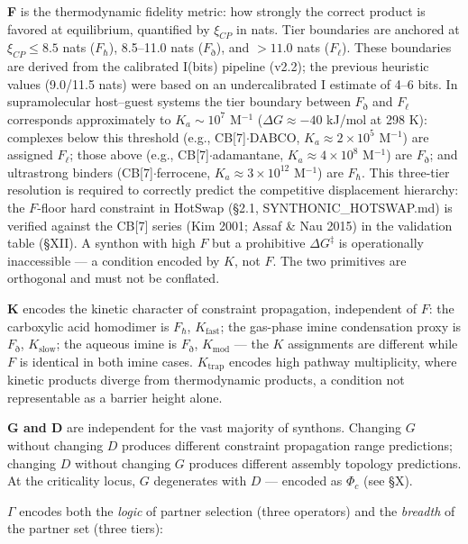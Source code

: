 \documentclass[12pt,a4paper]{article}
\begin{document}
\textbf{F} is the thermodynamic fidelity metric: how strongly the correct product is favored at equilibrium, quantified by $\xi_{CP}$ in nats. Tier boundaries are anchored at $\xi_{CP} \leq 8.5$ nats ($F_{\hbar}$), 8.5--11.0 nats ($F_{\eth}$), and $> 11.0$ nats ($F_{\ell}$). These boundaries are derived from the calibrated I(bits) pipeline (v2.2); the previous heuristic values (9.0/11.5 nats) were based on an undercalibrated I estimate of 4--6 bits. In supramolecular host--guest systems the tier boundary between $F_{\eth}$ and $F_{\ell}$ corresponds approximately to $K_a \sim 10^7$ M$^{-1}$ ($\Delta G \approx -40$ kJ/mol at 298 K): complexes below this threshold (e.g., CB{[}7{]}$\cdot$DABCO, $K_a \approx 2 \times 10^5$ M$^{-1}$) are assigned $F_{\ell}$; those above (e.g., CB{[}7{]}$\cdot$adamantane, $K_a \approx 4 \times 10^8$ M$^{-1}$) are $F_{\eth}$; and ultrastrong binders (CB{[}7{]}$\cdot$ferrocene, $K_a \approx 3 \times 10^{12}$ M$^{-1}$) are $F_{\hbar}$. This three-tier resolution is required to correctly predict the competitive displacement hierarchy: the $F$-floor hard constraint in HotSwap (§2.1, SYNTHONIC\_HOTSWAP.md) is verified against the CB{[}7{]} series (Kim 2001; Assaf \& Nau 2015) in the validation table (§XII). A synthon with high $F$ but a prohibitive $\Delta G^{\ddagger}$ is operationally inaccessible --- a condition encoded by $K$, not $F$. The two primitives are orthogonal and must not be conflated.

\textbf{K} encodes the kinetic character of constraint propagation, independent of $F$: the carboxylic acid homodimer is $F_{\hbar}$, $K_{\text{fast}}$; the gas-phase imine condensation proxy is $F_{\eth}$, $K_{\text{slow}}$; the aqueous imine is $F_{\eth}$, $K_{\text{mod}}$ --- the $K$ assignments are different while $F$ is identical in both imine cases. $K_{\text{trap}}$ encodes high pathway multiplicity, where kinetic products diverge from thermodynamic products, a condition not representable as a barrier height alone.

\textbf{G and D} are independent for the vast majority of synthons. Changing $G$ without changing $D$ produces different constraint propagation range predictions; changing $D$ without changing $G$ produces different assembly topology predictions. At the criticality locus, $G$ degenerates with $D$ --- encoded as $\Phi_c$ (see §X).

\textbf{$\Gamma$} encodes both the \emph{logic} of partner selection (three operators) and the \emph{breadth} of the partner set (three tiers):
\end{document}
